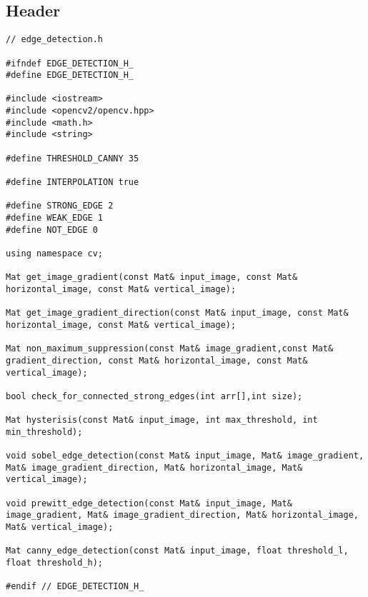 \subsection{Header}
\begin{lstlisting}
// edge_detection.h

#ifndef EDGE_DETECTION_H_
#define EDGE_DETECTION_H_

#include <iostream>
#include <opencv2/opencv.hpp>
#include <math.h>
#include <string>

#define THRESHOLD_CANNY 35

#define INTERPOLATION true

#define STRONG_EDGE 2
#define WEAK_EDGE 1
#define NOT_EDGE 0

using namespace cv;

Mat get_image_gradient(const Mat& input_image, const Mat& horizontal_image, const Mat& vertical_image);

Mat get_image_gradient_direction(const Mat& input_image, const Mat& horizontal_image, const Mat& vertical_image);

Mat non_maximum_suppression(const Mat& image_gradient,const Mat& gradient_direction, const Mat& horizontal_image, const Mat& vertical_image);

bool check_for_connected_strong_edges(int arr[],int size);

Mat hysterisis(const Mat& input_image, int max_threshold, int min_threshold);

void sobel_edge_detection(const Mat& input_image, Mat& image_gradient, Mat& image_gradient_direction, Mat& horizontal_image, Mat& vertical_image);

void prewitt_edge_detection(const Mat& input_image, Mat& image_gradient, Mat& image_gradient_direction, Mat& horizontal_image, Mat& vertical_image);

Mat canny_edge_detection(const Mat& input_image, float threshold_l, float threshold_h);

#endif // EDGE_DETECTION_H_

\end{lstlisting}
\pagebreak
